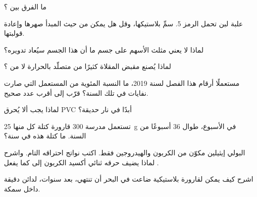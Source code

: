 \begin{exercise}[$\star$]\label{exo:g8:plastics:4}
ما الفرق بين  ؟
\end{exercise}

\begin{exercise}[$\star\star$]\label{exo:g8:plastics:5}
علبة لبن تحمل الرمز 5. سمِّ بلاستيكها، وقل هل يمكن من حيث المبدأ صهرها
وإعادة قولبتها.
\end{exercise}

\begin{exercise}[$\star\star$]\label{exo:g8:plastics:6}
لماذا لا يعني مثلث الأسهم على جسم ما أن هذا الجسم سيُعاد
تدويره؟
\end{exercise}

\begin{exercise}[$\star\star$]\label{exo:g8:plastics:7}
لماذا يُصنع مقبض المقلاة كثيرًا من  متصلّد بالحرارة لا من ؟
\end{exercise}

\begin{exercise}[$\star\star$]\label{exo:g8:plastics:8}
مستعملًا أرقام هذا الفصل لسنة 2019، ما النسبة المئوية من  المستعمل
التي صارت نفايات في تلك السنة؟ قرّب إلى أقرب عدد صحيح.
\end{exercise}

\begin{exercise}[$\star\star$]\label{exo:g8:plastics:9}
لماذا يجب ألا يُحرق PVC أبدًا في نار حديقة؟
\end{exercise}

\begin{exercise}[$\star\star$]\label{exo:g8:plastics:10}
تستعمل مدرسة 300 قارورة كتلة كل منها \qty{25}{g} في الأسبوع، طوال 36 أسبوعًا
من السنة. ما كتلة  هذه في سنة؟
\end{exercise}

\begin{exercise}[$\star\star\star$]\label{exo:g8:plastics:11}
البولي إيثيلين مكوّن من الكربون والهيدروجين فقط. اكتب نواتج احتراقه التام.
واشرح لماذا يضيف حرقه ثنائي أكسيد الكربون إلى  كما يفعل .
\end{exercise}

\begin{exercise}[$\star\star\star$]\label{exo:g8:plastics:12}
اشرح كيف يمكن لقارورة بلاستيكية ضاعت في البحر أن تنتهي، بعد سنوات، لدائن
دقيقة داخل سمكة.
\end{exercise}


